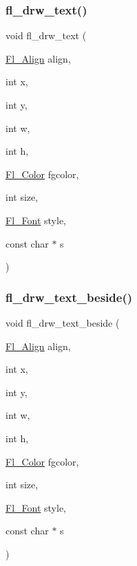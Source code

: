 \subsubsection{\texorpdfstring{fl\+\_\+drw\+\_\+text()}{fl\_drw\_text()}}
{\footnotesize\ttfamily void fl\+\_\+drw\+\_\+text (\begin{DoxyParamCaption}\item[{\hyperlink{_enumerations_8_h_a44e8bcd1e030e65e4f88cbae64a7c3e3}{Fl\+\_\+\+Align}}]{align,  }\item[{int}]{x,  }\item[{int}]{y,  }\item[{int}]{w,  }\item[{int}]{h,  }\item[{\hyperlink{_enumerations_8_h_a8b762953646f8abee866061f1af78a6a}{Fl\+\_\+\+Color}}]{fgcolor,  }\item[{int}]{size,  }\item[{\hyperlink{_enumerations_8_h_a2ac46d9f082834b969fffe490a03a709}{Fl\+\_\+\+Font}}]{style,  }\item[{const char $\ast$}]{s }\end{DoxyParamCaption})\hspace{0.3cm}{\ttfamily [inline]}}

\mbox{\label{forms_8_h_a313c7b108223d9452fd5f6d4b0b70965}} 
\subsubsection{\texorpdfstring{fl\+\_\+drw\+\_\+text\+\_\+beside()}{fl\_drw\_text\_beside()}}
{\footnotesize\ttfamily void fl\+\_\+drw\+\_\+text\+\_\+beside (\begin{DoxyParamCaption}\item[{\hyperlink{_enumerations_8_h_a44e8bcd1e030e65e4f88cbae64a7c3e3}{Fl\+\_\+\+Align}}]{align,  }\item[{int}]{x,  }\item[{int}]{y,  }\item[{int}]{w,  }\item[{int}]{h,  }\item[{\hyperlink{_enumerations_8_h_a8b762953646f8abee866061f1af78a6a}{Fl\+\_\+\+Color}}]{fgcolor,  }\item[{int}]{size,  }\item[{\hyperlink{_enumerations_8_h_a2ac46d9f082834b969fffe490a03a709}{Fl\+\_\+\+Font}}]{style,  }\item[{const char $\ast$}]{s }\end{DoxyParamCaption})\hspace{0.3cm}{\ttfamily [inline]}}

